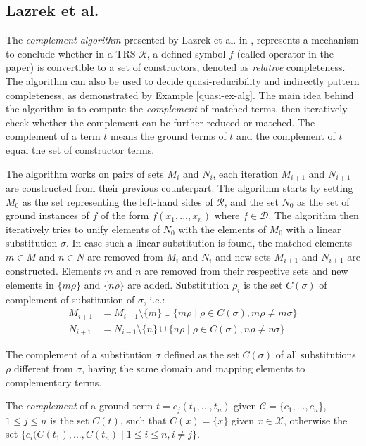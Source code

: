 \subsection{Lazrek et al.} \label{lazrek}
The \textit{complement algorithm} presented by Lazrek et al. in \cite{lazrek}, represents a mechanism to conclude whether in a TRS $\mathcal{R}$, a defined symbol $f$ (called operator in the paper) is convertible to a set of constructors, denoted as \textit{relative} completeness. The algorithm can also be used to decide quasi-reducibility and indirectly pattern completeness, as demonstrated by Example \ref{quasi-ex-alg}. The main idea behind the algorithm is to compute the \textit{complement} of matched terms, then iteratively check whether the complement can be further reduced or matched. The complement of a term $t$ means the ground terms of $t$ and the complement of $t$ equal the set of constructor terms.

The algorithm works on pairs of sets $M_i$ and $N_i$, each iteration $M_{i+1}$ and $N_{i+1}$ are constructed from their previous counterpart. The algorithm starts by setting $M_0$ as the set representing the left-hand sides of $\mathcal{R}$, and the set $N_0$ as the set of ground instances of $f$ of the form $f(x_1, ..., x_n)$ where $f \in \mathcal{D}$. The algorithm then iteratively tries to unify elements of $N_0$ with the elements of $M_0$ with a linear substitution $\sigma$. In case such a linear substitution is found, the matched elements $m \in M$ and $n \in N$ are removed from $M_i$ and $N_i$ and new sets $M_{i+1}$ and $N_{i+1}$ are constructed. Elements $m$ and $n$ are removed from their respective sets and new elements in $\{m\rho\}$ and $\{n\rho\}$ are added. Substitution $\rho_i$ is the set $C(\sigma)$ of complement of substitution of $\sigma$, i.e.:
\begin{align*}
    M_{i+1} &= M_{i-1} \setminus \{m\} \cup \{m\rho \mid \rho \in C(\sigma), m\rho \neq m\sigma\} \\
    N_{i+1} &= N_{i-1} \setminus \{n\} \cup \{n\rho \mid \rho \in C(\sigma), n\rho \neq n\sigma\}
\end{align*}

The complement of a substitution $\sigma$ defined as the set $C(\sigma)$ of all substitutions $\rho$ different from $\sigma$, having the same domain and mapping elements to complementary terms.

The \textit{complement} of a ground term $t = c_j(t_1, ... , t_n)$ given $\mathcal{C} = \{c_1, ..., c_n\}$, $1 \leq j \leq n$ is the set $C(t)$, such that $C(x) = \{x\}$ given $x \in \mathcal{X}$, otherwise the set $\{c_i(C(t_1), ..., C(t_n) \mid 1\leq i \leq n, i \neq j\}$.

